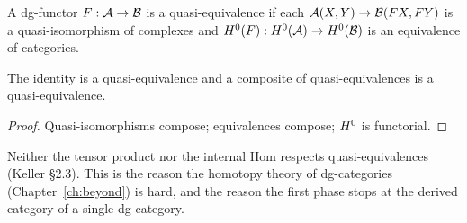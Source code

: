 \begin{definition}
\label{def:quasi-equivalence}
A dg-functor $F : \mathcal{A} \to \mathcal{B}$ is a quasi-equivalence if each $\mathcal{A}(X,Y) \to \mathcal{B}(FX,FY)$
is a quasi-isomorphism of complexes and $H^0(F) : H^0(\mathcal{A}) \to H^0(\mathcal{B})$ is an
equivalence of categories.
\end{definition}

\begin{lemma}
\label{lem:quasi-equivalence-comp}
The identity is a quasi-equivalence and a composite of quasi-equivalences is a
quasi-equivalence.
\end{lemma}
\begin{proof}
Quasi-isomorphisms compose; equivalences compose; $H^0$ is functorial.
\end{proof}

\begin{remark}
Neither the tensor product nor the internal Hom respects quasi-equivalences (Keller \S 2.3).
This is the reason the homotopy theory of dg-categories (Chapter~\ref{ch:beyond}) is hard,
and the reason the first phase stops at the derived category of a single dg-category.
\end{remark}

